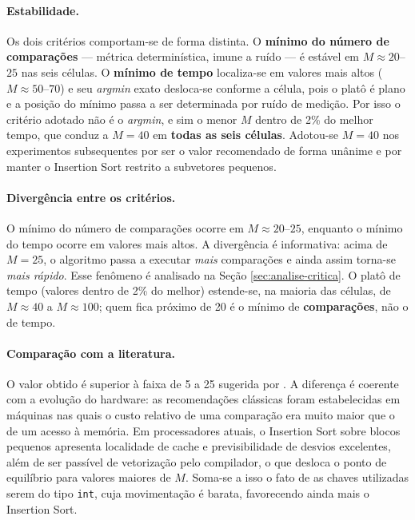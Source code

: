 \paragraph{Estabilidade.} Os dois critérios comportam-se de forma distinta. O
\textbf{mínimo do número de comparações} --- métrica determinística, imune a ruído ---
é estável em $M \approx 20$--$25$ nas seis células. O \textbf{mínimo de tempo}
localiza-se em valores mais altos ($M \approx 50$--$70$) e seu \textit{argmin} exato
desloca-se conforme a célula, pois o platô é plano e a posição do mínimo passa a ser
determinada por ruído de medição. Por isso o critério adotado não é o \textit{argmin},
e sim o menor $M$ dentro de 2\% do melhor tempo, que conduz a $M = 40$ em
\textbf{todas as seis células}. Adotou-se $M = 40$ nos experimentos subsequentes por
ser o valor recomendado de forma unânime e por manter o Insertion Sort restrito a
subvetores pequenos.

\paragraph{Divergência entre os critérios.} O mínimo do número de comparações ocorre
em $M \approx 20$--$25$, enquanto o mínimo do tempo ocorre em valores mais altos. A
divergência é informativa: acima de $M = 25$, o algoritmo passa a executar
\textit{mais} comparações e ainda assim torna-se \textit{mais rápido}. Esse fenômeno
é analisado na Seção \ref{sec:analise-critica}. O platô de tempo (valores dentro de
2\% do melhor) estende-se, na maioria das células, de $M \approx 40$ a $M \approx 100$;
quem fica próximo de 20 é o mínimo de \textbf{comparações}, não o de tempo.

\paragraph{Comparação com a literatura.} O valor obtido é superior à faixa de 5 a 25
sugerida por . A diferença é coerente com a evolução do
hardware: as recomendações clássicas foram estabelecidas em máquinas nas quais o
custo relativo de uma comparação era muito maior que o de um acesso à memória. Em
processadores atuais, o Insertion Sort sobre blocos pequenos apresenta localidade de
cache e previsibilidade de desvios excelentes, além de ser passível de vetorização
pelo compilador, o que desloca o ponto de equilíbrio para valores maiores de $M$.
Soma-se a isso o fato de as chaves utilizadas serem do tipo \texttt{int}, cuja
movimentação é barata, favorecendo ainda mais o Insertion Sort.

